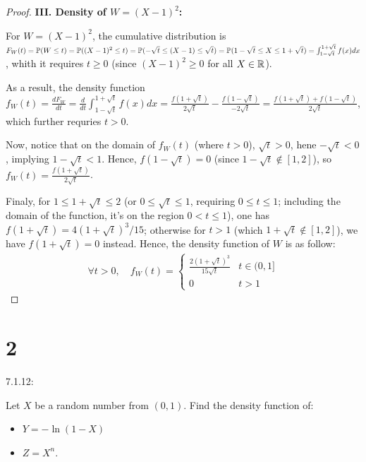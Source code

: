 \documentclass{article}
\begin{document}
\begin{proof}
    \hfil

    \textbf{III. Density of $W=(X-1)^2$:}

    For $W=(X-1)^2$, the cumulative distribution is $F_W(t)=\mathbb{P}(W\leq t)=\mathbb{P}((X-1)^2\leq t) = \mathbb{P}(-\sqrt{t}\leq (X-1)\leq \sqrt{t})=\mathbb{P}(1-\sqrt{t}\leq X\leq 1+\sqrt{t}) = \int_{1-\sqrt{t}}^{1+\sqrt{t}}f(x)dx$, whith it requires $t\geq 0$ (since $(X-1)^2\geq 0$ for all $X\in\mathbb{R}$).

    As a result, the density function $f_W(t)=\frac{dF_W}{dt}=\frac{d}{dt}\int_{1-\sqrt{t}}^{1+\sqrt{t}}f(x)dx = \frac{f(1+\sqrt{t})}{2\sqrt{t}}-\frac{f(1-\sqrt{t})}{-2\sqrt{t}} = \frac{f(1+\sqrt{t})+f(1-\sqrt{t})}{2\sqrt{t}}$, which further requries $t>0$.

    Now, notice that on the domain of $f_W(t)$ (where $t>0$), $\sqrt{t}>0$, hene $-\sqrt{t}<0$, implying $1-\sqrt{t}<1$. Hence, $f(1-\sqrt{t})=0$ (since $1-\sqrt{t}\notin [1,2]$), so $f_W(t)=\frac{f(1+\sqrt{t})}{2\sqrt{t}}$.

    Finaly, for $1\leq 1+\sqrt{t}\leq 2$ (or $0\leq \sqrt{t}\leq 1$, requiring $0\leq t\leq 1$; including the domain of the function, it's on the region $0<t\leq 1$), one has $f(1+\sqrt{t}) = 4(1+\sqrt{t})^3/15$; otherwise for $t>1$ (which $1+\sqrt{t}\notin[1,2]$), we have $f(1+\sqrt{t})=0$ instead. Hence, the density function of $W$ is as follow:
    \begin{align}
        \forall t>0,\quad f_W(t)=\begin{cases}
            \frac{2(1+\sqrt{t})^3}{15\sqrt{t}} & t\in(0,1]\\
            0 & t>1
        \end{cases}
    \end{align}
\end{proof}

\hfil

\section*{2}
\begin{ques}\label{q2}
    7.1.12:

    Let $X$ be a random number from $(0,1)$. Find the density function of:
    \begin{itemize}
        \item[(a)] $Y=-\ln(1-X)$
        \item[(b)] $Z=X^n$. 
    \end{itemize}
\end{ques}
\end{document}
